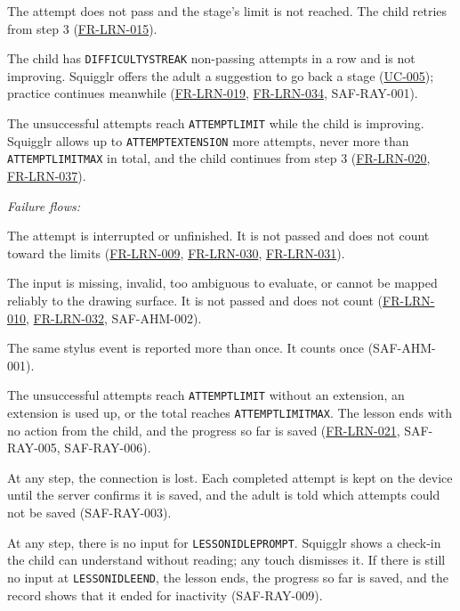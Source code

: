 \documentclass[12pt]{article}
\renewcommand{\_}{\textunderscore\allowbreak}%
\newcommand{\ucref}[1]{\hyperref[uc:#1]{\mbox{UC-#1}}}
\newcommand{\reqref}[1]{\hyperref[req:#1]{#1}}
\providecommand{\ucref}[1]{\hyperref[uc:#1]{UC-#1}}
\begin{document}
\begin{description}[nosep, leftmargin=2.2em, font=\normalfont]
  \item[6a.] The attempt does not pass and the stage's limit is not reached. The
  child retries from step 3 (\mbox{\reqref{FR-LRN-015}}).
  \item[6b.] The child has \texttt{DIFFICULTY\_STREAK} non-passing attempts in a
  row and is not improving. Squigglr offers the adult a suggestion to go back a
  stage (\ucref{005}); practice continues meanwhile (\mbox{\reqref{FR-LRN-019}}, \mbox{\reqref{FR-LRN-034}},
  \mbox{SAF-RAY-001}).
  \item[6c.] The unsuccessful attempts reach \texttt{ATTEMPT\_LIMIT} while the
  child is improving. Squigglr allows up to \texttt{ATTEMPT\_EXTENSION} more
  attempts, never more than \texttt{ATTEMPT\_LIMIT\_MAX} in total, and the child
  continues from step 3 (\mbox{\reqref{FR-LRN-020}}, \mbox{\reqref{FR-LRN-037}}).
\end{description}
\noindent\textit{Failure flows:}
\begin{description}[nosep, leftmargin=2.2em, font=\normalfont]
  \item[3a.] The attempt is interrupted or unfinished. It is not passed and does
  not count toward the limits (\mbox{\reqref{FR-LRN-009}}, \mbox{\reqref{FR-LRN-030}}, \mbox{\reqref{FR-LRN-031}}).
  \item[3b.] The input is missing, invalid, too ambiguous to evaluate, or cannot
  be mapped reliably to the drawing surface. It is not passed and does not count
  (\mbox{\reqref{FR-LRN-010}}, \mbox{\reqref{FR-LRN-032}}, \mbox{SAF-AHM-002}).
  \item[3c.] The same stylus event is reported more than once. It counts once
  (\mbox{SAF-AHM-001}).
  \item[6d.] The unsuccessful attempts reach \texttt{ATTEMPT\_LIMIT} without an
  extension, an extension is used up, or the total reaches
  \texttt{ATTEMPT\_LIMIT\_MAX}. The lesson ends with no action from the child,
  and the progress so far is saved (\mbox{\reqref{FR-LRN-021}},
  \mbox{SAF-RAY-005}, \mbox{SAF-RAY-006}).
  \item[*a.] At any step, the connection is lost. Each completed attempt is kept
  on the device until the server confirms it is saved, and the adult is told
  which attempts could not be saved (\mbox{SAF-RAY-003}).
  \item[*b.] At any step, there is no input for \texttt{LESSON\_IDLE\_PROMPT}.
  Squigglr shows a check-in the child can understand without reading; any touch
  dismisses it. If there is still no input at \texttt{LESSON\_IDLE\_END}, the
  lesson ends, the progress so far is saved, and the record shows that it ended
  for inactivity (\mbox{SAF-RAY-009}).
\end{description}
\end{document}
